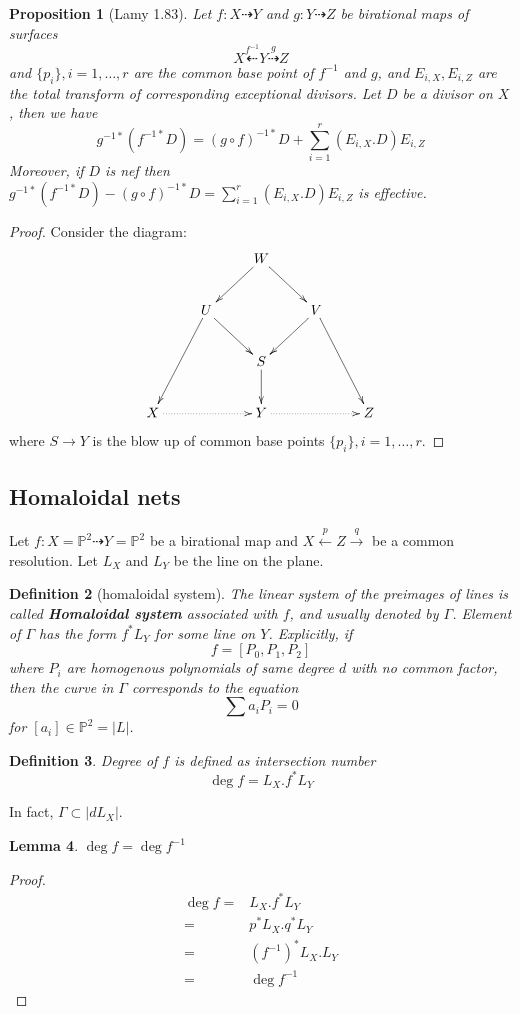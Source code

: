 \documentclass{article}
\newtheorem{defn}{Definition}[section]
\newtheorem{prop}[defn]{Proposition}
\newtheorem{lem}[defn]{Lemma}
\begin{document}
\begin{prop}[Lamy 1.83]
  Let $ f:X\dashrightarrow Y $ and $ g:Y\dashrightarrow Z $ be birational maps of surfaces 
  \[ X\overset{f^{-1}}{\dashleftarrow}Y\overset{g}{\dashrightarrow}Z \]
  and $\{p_i\},i=1,\ldots,r $ are the common base point of $ f^{-1} $ and $ g $, and $ E_{i,X},E_{i,Z} $ are the total transform of corresponding exceptional divisors. Let $ D $ be a divisor on $ X $, then we have
  \[ g^{-1*}(f^{-1*}D)=(g\circ f)^{-1*}D+\sum_{i=1}^{r}(E_{i,X}.D)E_{i,Z} \]
  Moreover, if $ D $ is nef then $  g^{-1*}(f^{-1*}D)-(g\circ f)^{-1*}D=\sum_{i=1}^{r}(E_{i,X}.D)E_{i,Z} $ is effective.
\end{prop}


\begin{proof}
  Consider the diagram:
  \[ \xymatrix{
    &&W\ar[rd]\ar[ld]\\
  &U\ar[ldd]\ar[rd]&&V\ar[rdd]\ar[ld]\\
  &&S\ar[d]\\
  X\ar@{.>}[rr]&&Y\ar@{.>}[rr]&&Z} \]
where $ S\to Y $ is the blow up of common base points $\{p_i\},i=1,\ldots,r $.
\end{proof}

\subsection{Homaloidal nets}
Let $ f:X=\mathbb{P}^2\dashrightarrow Y=\mathbb{P}^2 $ be a birational map and $ X\xleftarrow{p}Z\xrightarrow{q} $ be a common resolution. Let $ L_X $ and $ L_Y $ be the line on the plane.
\begin{defn}[homaloidal system]
  The linear system of the preimages of lines is called \textbf{Homaloidal system} associated with $ f $, and usually denoted by $ \Gamma $. Element of $ \Gamma $ has the form $ f^*L_Y $ for some line on $ Y $. Explicitly, if 
  \[ f=[P_0,P_1,P_2] \]
  where $ P_i $ are homogenous polynomials of same degree $ d $ with no common factor, then the curve in $ \Gamma $ corresponds to the equation
  \[ \sum a_iP_i=0 \]
  for $ [a_i]\in \mathbb{P}^2=|L| $.
\end{defn}
\begin{defn}
  Degree of $ f $ is defined as intersection number
  \[ \deg f=L_X.f^*L_Y \]
\end{defn}
In fact, $ \Gamma\subset |dL_X| $.

\begin{lem}
  $ \deg f=\deg f^{-1} $
\end{lem}
\begin{proof}
  \begin{equation*}
    \begin{aligned}
      \deg f=&L_X.f^*L_Y\\
      =&p^*L_X.q^*L_Y\\
      =&(f^{-1})^*L_X.L_Y\\
      =&\deg f^{-1}
    \end{aligned}
  \end{equation*}
\end{proof}
\end{document}
